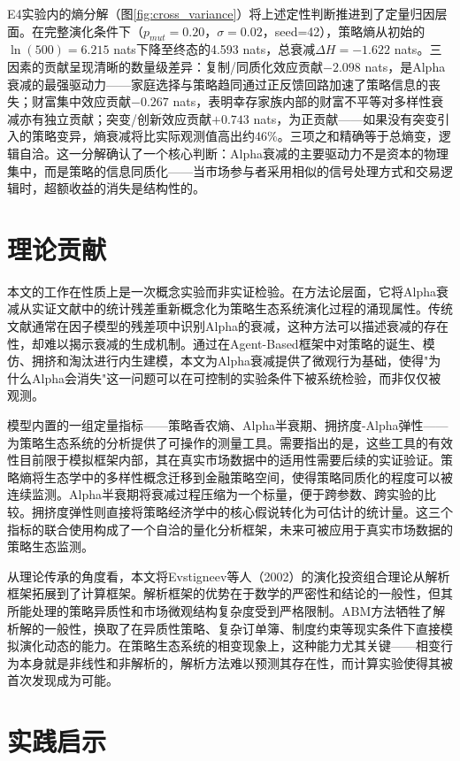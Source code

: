 E4实验内的熵分解（图\ref{fig:cross_variance}）将上述定性判断推进到了定量归因层面。在完整演化条件下（$p_{mut}=0.20$，$\sigma=0.02$，seed=42），策略熵从初始的$\ln(500)=6.215$ nats下降至终态的4.593 nats，总衰减$\Delta H=-1.622$ nats。三因素的贡献呈现清晰的数量级差异：复制/同质化效应贡献$-2.098$ nats，是Alpha衰减的最强驱动力——家庭选择与策略趋同通过正反馈回路加速了策略信息的丧失；财富集中效应贡献$-0.267$ nats，表明幸存家族内部的财富不平等对多样性衰减亦有独立贡献；突变/创新效应贡献$+0.743$ nats，为正贡献——如果没有突变引入的策略变异，熵衰减将比实际观测值高出约46\%。三项之和精确等于总熵变，逻辑自洽。这一分解确认了一个核心判断：Alpha衰减的主要驱动力不是资本的物理集中，而是策略的信息同质化——当市场参与者采用相似的信号处理方式和交易逻辑时，超额收益的消失是结构性的。

\section{理论贡献}

本文的工作在性质上是一次概念实验而非实证检验。在方法论层面，它将Alpha衰减从实证文献中的统计残差重新概念化为策略生态系统演化过程的涌现属性。传统文献通常在因子模型的残差项中识别Alpha的衰减，这种方法可以描述衰减的存在性，却难以揭示衰减的生成机制。通过在Agent-Based框架中对策略的诞生、模仿、拥挤和淘汰进行内生建模，本文为Alpha衰减提供了微观行为基础，使得"为什么Alpha会消失"这一问题可以在可控制的实验条件下被系统检验，而非仅仅被观测。

模型内置的一组定量指标——策略香农熵、Alpha半衰期、拥挤度-Alpha弹性——为策略生态系统的分析提供了可操作的测量工具。需要指出的是，这些工具的有效性目前限于模拟框架内部，其在真实市场数据中的适用性需要后续的实证验证。策略熵将生态学中的多样性概念迁移到金融策略空间，使得策略同质化的程度可以被连续监测。Alpha半衰期将衰减过程压缩为一个标量，便于跨参数、跨实验的比较。拥挤度弹性则直接将策略经济学中的核心假说转化为可估计的统计量。这三个指标的联合使用构成了一个自洽的量化分析框架，未来可被应用于真实市场数据的策略生态监测。

从理论传承的角度看，本文将Evstigneev等人（2002）的演化投资组合理论从解析框架拓展到了计算框架。解析框架的优势在于数学的严密性和结论的一般性，但其所能处理的策略异质性和市场微观结构复杂度受到严格限制。ABM方法牺牲了解析解的一般性，换取了在异质性策略、复杂订单簿、制度约束等现实条件下直接模拟演化动态的能力。在策略生态系统的相变现象上，这种能力尤其关键——相变行为本身就是非线性和非解析的，解析方法难以预测其存在性，而计算实验使得其被首次发现成为可能。

\section{实践启示}

